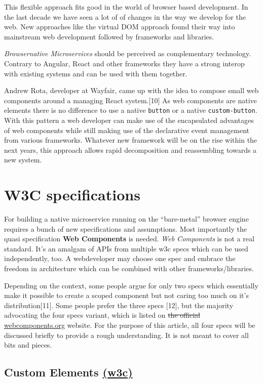 \documentclass[]{article}
\begin{document}
This flexible approach fits good in the world of browser based
development. In the last decade we have seen a lot of of changes in the
way we develop for the web. New approaches like the virtual DOM approach
found their way into mainstream web development followed by frameworks
and libraries.

\emph{Browsernative Microservices} should be perceived as complementary
technology. Contrary to Angular, React and other frameworks they have a
strong interop with existing systems and can be used with them together.

Andrew Rota, developer at Wayfair, came up with the idea to compose
small web components around a managing React system.{[}10{]} As web
components are native elements there is no difference to use a native
\texttt{button} or a native \texttt{custom-button}. With this pattern a
web developer can make use of the encapsulated advantages of web
components while still making use of the declarative event management
from various frameworks. Whatever new framework will be on the rise
within the next years, this approach allows rapid decomposition and
reassembling towards a new system.

\section{W3C specifications}\label{w3c-specifications}

For building a native microservice running on the ``bare-metal'' browser
engine requires a bunch of new specifications and assumptions. Most
importantly the quasi specification \textbf{Web Components} is needed.
\emph{Web Components} is not a real standard. It's an amalgam of APIs
from multiple w3c specs which can be used independently, too. A
webdeveloper may choose one spec and embrace the freedom in architecture
which can be combined with other frameworks/libraries.

Depending on the context, some people argue for only two specs which
essentially make it possible to create a scoped component but not caring
too much on it's distribution{[}11{]}. Some people prefer the three
specs {[}12{]}, but the majority advocating the four specs variant,
which is listed on \sout{the official}
\href{http://webcomponents.org}{webcomponents.org} website. For the
purpose of this article, all four specs will be discussed briefly to
provide a rough understanding. It is not meant to cover all bits and
pieces.

\subsection{\texorpdfstring{Custom Elements
\href{http://w3c.github.io/webcomponents/spec/custom/}{(w3c)}}{Custom Elements (w3c)}}\label{custom-elements-w3c}
\end{document}

